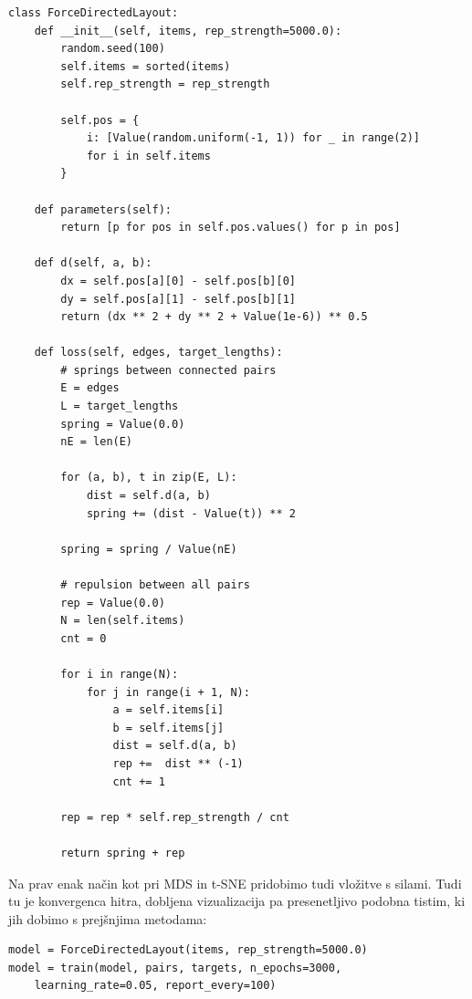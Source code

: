 \vspace*{3mm}
\begin{lstlisting}
class ForceDirectedLayout:
    def __init__(self, items, rep_strength=5000.0):
        random.seed(100)
        self.items = sorted(items)
        self.rep_strength = rep_strength

        self.pos = {
            i: [Value(random.uniform(-1, 1)) for _ in range(2)]
            for i in self.items
        }

    def parameters(self):
        return [p for pos in self.pos.values() for p in pos]

    def d(self, a, b):
        dx = self.pos[a][0] - self.pos[b][0]
        dy = self.pos[a][1] - self.pos[b][1]
        return (dx ** 2 + dy ** 2 + Value(1e-6)) ** 0.5

    def loss(self, edges, target_lengths):
        # springs between connected pairs
        E = edges
        L = target_lengths
        spring = Value(0.0)
        nE = len(E)

        for (a, b), t in zip(E, L):
            dist = self.d(a, b)
            spring += (dist - Value(t)) ** 2

        spring = spring / Value(nE)

        # repulsion between all pairs
        rep = Value(0.0)
        N = len(self.items)
        cnt = 0

        for i in range(N):
            for j in range(i + 1, N):
                a = self.items[i]
                b = self.items[j]
                dist = self.d(a, b)
                rep +=  dist ** (-1)
                cnt += 1

        rep = rep * self.rep_strength / cnt
        
        return spring + rep
\end{lstlisting}

Na prav enak način kot pri MDS in t-SNE pridobimo tudi vložitve s silami. Tudi tu je konvergenca hitra, dobljena vizualizacija pa presenetljivo podobna tistim, ki jih dobimo s prejšnjima metodama:
\vspace*{3mm}
\begin{lstlisting}
model = ForceDirectedLayout(items, rep_strength=5000.0)
model = train(model, pairs, targets, n_epochs=3000,
    learning_rate=0.05, report_every=100)
\end{lstlisting}

